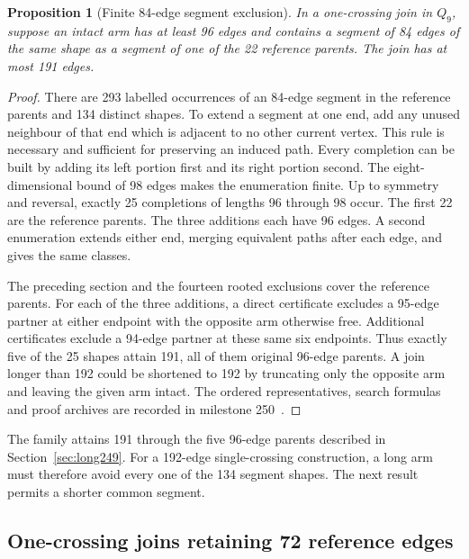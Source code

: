 \documentclass[11pt,a4paper]{article}
\newtheorem{proposition}[theorem]{Proposition}
\theoremstyle{definition}
\theoremstyle{remark}
\begin{document}
\begin{proposition}[Finite 84-edge segment exclusion]\label{prop:core250}
In a one-crossing join in $Q_9$, suppose an intact arm has at least 96
edges and contains a segment of 84 edges of the same shape as a segment
of one of the 22 reference parents. The join has at most 191 edges.
\end{proposition}
\begin{proof}
There are 293 labelled occurrences of an 84-edge segment in the reference
parents and 134 distinct shapes. To extend a segment at one end, add any
unused neighbour of that end which is adjacent to no other current
vertex. This rule is necessary and sufficient for preserving an induced
path. Every completion can be built by adding its left portion first
and its right portion second. The eight-dimensional bound of 98 edges
makes the enumeration finite. Up to symmetry and reversal, exactly 25
completions of lengths 96 through 98 occur. The first 22 are the
reference parents. The three additions each have 96 edges. A second
enumeration extends either end, merging equivalent paths after each
edge, and gives the same classes.

The preceding section and the fourteen rooted exclusions cover the
reference parents. For each of the three additions, a direct certificate
excludes a 95-edge partner at either endpoint with the opposite arm
otherwise free. Additional certificates exclude a 94-edge partner at
these same six endpoints. Thus exactly five of the 25 shapes attain
191, all of them original 96-edge parents. A join longer than 192
could be shortened to 192 by
truncating only the opposite arm and leaving the given arm intact.
The ordered representatives, search formulas and proof archives are
recorded in milestone 250~\cite{corner250}.
\end{proof}

The family attains 191 through the five 96-edge parents described in
Section~\ref{sec:long249}. For a 192-edge single-crossing construction,
a long arm must therefore avoid every one of the 134 segment shapes.
The next result permits a shorter common segment.

\subsection{One-crossing joins retaining 72 reference edges}\label{sec:segment251}
\end{document}
